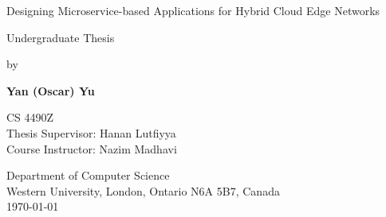 \begin{titlepage}
    \begin{center}
        \vspace*{1cm}

        \Huge{Designing Microservice-based Applications for Hybrid Cloud Edge Networks}
        \vspace{0.5cm}

        \Large
        Undergraduate Thesis
        \vspace{0.5cm}

        by
        \vspace{0.5cm}

        \textbf{Yan (Oscar) Yu}

        \vfill

        \large
        CS 4490Z\\
        Thesis Supervisor: Hanan Lutfiyya\\
        Course Instructor: Nazim Madhavi

        \vspace{0.5cm}
        Department of Computer Science\\
        Western University, London, Ontario N6A 5B7, Canada\\
        \today

    \end{center}
\end{titlepage}